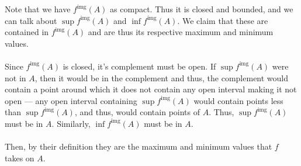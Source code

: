 \documentclass[12pt, letterpaper]{hmcpset}
\begin{document}
\begin{solution}
	Note that we have $f^{\text{img}}(A)$ as compact. Thus it is closed and bounded, and we can talk about $\sup f^{\text{img}}(A)$ and $\inf f^{\text{img}}(A)$. We claim that these are contained in $f^{\text{img}}(A)$ and are thus its respective maximum and minimum values.\\\\
	Since $f^{\text{img}}(A)$ is closed, it's complement must be open. If $\sup f^\text{img}(A)$ were not in $A$, then it would be in the complement and thus, the complement would contain a point around which it does not contain any open interval making it not open --- any open interval containing $\sup f^\text{img}(A)$ would contain points less than $\sup f^\text{img}(A)$, and thus, would contain points of $A$. Thus, $\sup f^\text{img}(A)$ must be in $A$. Similarly, $\inf f^\text{img}(A)$ must be in $A$. \\\\
	Then, by their definition they are the maximum and minimum values that $f$ takes on $A$.
\end{solution}
\end{document}
